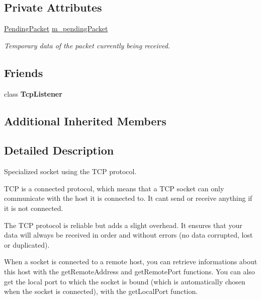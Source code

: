 \subsection*{Private Attributes}
\begin{DoxyCompactItemize}
\item 
\mbox{\label{classsf_1_1_tcp_socket_ab46b6b5cfafbc4255d8bdca3148584a8}} 
\mbox{\hyperlink{structsf_1_1_tcp_socket_1_1_pending_packet}{Pending\+Packet}} \mbox{\hyperlink{classsf_1_1_tcp_socket_ab46b6b5cfafbc4255d8bdca3148584a8}{m\+\_\+pending\+Packet}}
\begin{DoxyCompactList}\small\item\em Temporary data of the packet currently being received. \end{DoxyCompactList}\end{DoxyCompactItemize}
\subsection*{Friends}
\begin{DoxyCompactItemize}
\item 
\mbox{\label{classsf_1_1_tcp_socket_a2b2dd140834917bd44b512236bddea7c}} 
class {\bfseries Tcp\+Listener}
\end{DoxyCompactItemize}
\subsection*{Additional Inherited Members}


\subsection{Detailed Description}
Specialized socket using the T\+CP protocol. 

\begin{DoxyVerb}\end{DoxyVerb}


T\+CP is a connected protocol, which means that a T\+CP socket can only communicate with the host it is connected to. It can\textquotesingle{}t send or receive anything if it is not connected.

The T\+CP protocol is reliable but adds a slight overhead. It ensures that your data will always be received in order and without errors (no data corrupted, lost or duplicated).

When a socket is connected to a remote host, you can retrieve informations about this host with the get\+Remote\+Address and get\+Remote\+Port functions. You can also get the local port to which the socket is bound (which is automatically chosen when the socket is connected), with the get\+Local\+Port function.

